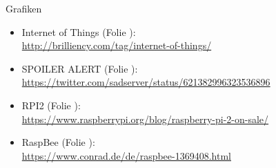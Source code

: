 \documentclass[10pt, compress]{beamer}
\begin{document}
\begin{frame}{Grafiken}
  \begin{itemize}
    \item \small{Internet of Things (Folie \pageref{fig:iot}):}\\
      \footnotesize{
        \url{http://brilliency.com/tag/internet-of-things/}
      }
    \item \small{SPOILER ALERT (Folie \pageref{fig:spoiler}):}\\
      \footnotesize{
        \url{https://twitter.com/sadserver/status/621382996323536896}
      }
    \item \small{RPI2 (Folie \pageref{fig:rpi}):}\\
      \footnotesize{
        \url{https://www.raspberrypi.org/blog/raspberry-pi-2-on-sale/}
      }
    \item \small{RaspBee (Folie \pageref{fig:rbee}):}\\
      \footnotesize{
        \url{https://www.conrad.de/de/raspbee-1369408.html}
      }
  \end{itemize}
  
\end{frame}
\end{document}
